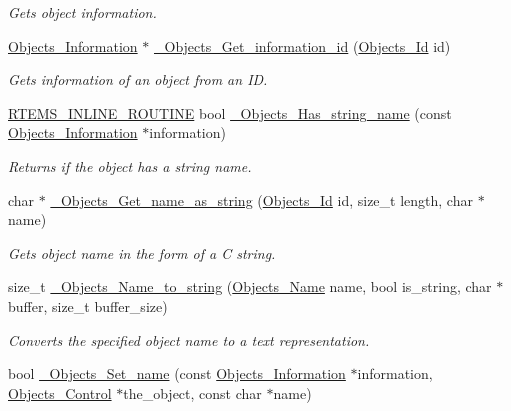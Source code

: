 \begin{DoxyCompactItemize}
\begin{DoxyCompactList}\small\item\em Gets object information. \end{DoxyCompactList}\item 
\mbox{\hyperlink{structObjects__Information}{Objects\+\_\+\+Information}} $\ast$ \mbox{\hyperlink{group__RTEMSScoreObject_ga73bb4fe5d6c1200fba89863b6d5fe6db}{\+\_\+\+Objects\+\_\+\+Get\+\_\+information\+\_\+id}} (\mbox{\hyperlink{group__RTEMSScoreObject_ga5821f52a51072941bdd603e542d0863e}{Objects\+\_\+\+Id}} id)
\begin{DoxyCompactList}\small\item\em Gets information of an object from an ID. \end{DoxyCompactList}\item 
\mbox{\hyperlink{group__RTEMSScoreBaseDefs_gac216239df231d5dbd15e3520b0b9313f}{R\+T\+E\+M\+S\+\_\+\+I\+N\+L\+I\+N\+E\+\_\+\+R\+O\+U\+T\+I\+NE}} bool \mbox{\hyperlink{group__RTEMSScoreObject_ga0a217bcdc113857e4f370aea14dbe025}{\+\_\+\+Objects\+\_\+\+Has\+\_\+string\+\_\+name}} (const \mbox{\hyperlink{structObjects__Information}{Objects\+\_\+\+Information}} $\ast$information)
\begin{DoxyCompactList}\small\item\em Returns if the object has a string name. \end{DoxyCompactList}\item 
char $\ast$ \mbox{\hyperlink{group__RTEMSScoreObject_gabd551c27404cc5db7e78b6ad24a5dda9}{\+\_\+\+Objects\+\_\+\+Get\+\_\+name\+\_\+as\+\_\+string}} (\mbox{\hyperlink{group__RTEMSScoreObject_ga5821f52a51072941bdd603e542d0863e}{Objects\+\_\+\+Id}} id, size\+\_\+t length, char $\ast$name)
\begin{DoxyCompactList}\small\item\em Gets object name in the form of a C string. \end{DoxyCompactList}\item 
size\+\_\+t \mbox{\hyperlink{group__RTEMSScoreObject_ga0c16ba5de651203f0eb5ce0d51ed8a7e}{\+\_\+\+Objects\+\_\+\+Name\+\_\+to\+\_\+string}} (\mbox{\hyperlink{unionObjects__Name}{Objects\+\_\+\+Name}} name, bool is\+\_\+string, char $\ast$buffer, size\+\_\+t buffer\+\_\+size)
\begin{DoxyCompactList}\small\item\em Converts the specified object name to a text representation. \end{DoxyCompactList}\item 
bool \mbox{\hyperlink{group__RTEMSScoreObject_gadd5c974f986efd3e78363740eee4b249}{\+\_\+\+Objects\+\_\+\+Set\+\_\+name}} (const \mbox{\hyperlink{structObjects__Information}{Objects\+\_\+\+Information}} $\ast$information, \mbox{\hyperlink{structObjects__Control}{Objects\+\_\+\+Control}} $\ast$the\+\_\+object, const char $\ast$name)

\end{DoxyCompactItemize}
